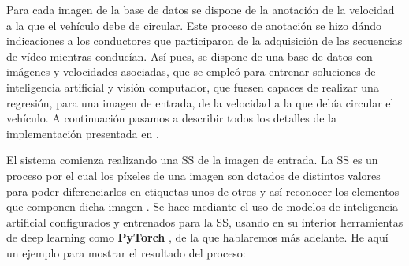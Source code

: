 Para cada imagen de la base de datos se dispone de la anotación de la velocidad a la que el vehículo debe de circular. Este proceso de anotación se hizo dándo indicaciones a los conductores que participaron de la adquisición de las secuencias de vídeo mientras conducían. Así pues, se dispone de una base de datos con imágenes y velocidades asociadas, que se empleó para entrenar soluciones de inteligencia artificial y visión computador, que fuesen capaces de realizar una regresión, para una imagen de entrada, de la velocidad a la que debía circular el vehículo. A continuación pasamos a describir todos los detalles de la implementación presentada en \cite{isa2}.

El sistema comienza realizando una \ac{SS} de la imagen de entrada. La \ac{SS} es un proceso por el cual los píxeles de una imagen son dotados de distintos valores para poder diferenciarlos en etiquetas unos de otros y así reconocer los elementos que componen dicha imagen \cite{deeplab}. Se hace mediante el uso de modelos de inteligencia artificial configurados y entrenados para la \ac{SS}, usando en su interior herramientas de deep learning como \textbf{PyTorch} \cite{pytorch}, de la que hablaremos más adelante. He aquí un ejemplo para mostrar el resultado del proceso:

